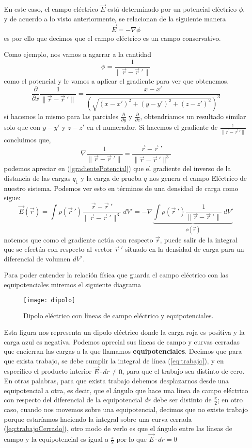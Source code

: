 \documentclass[11pt,a4paper]{article}
\begin{document}
En este caso, el campo eléctrico $\vec{E}$ está determinado por un potencial eléctrico $\phi$, y de acuerdo a lo visto anteriormente, se relacionan de la siguiente manera
$$\vec{E}=-\nabla \phi$$
es por ello que decimos que el campo eléctrico es un campo conservativo.

Como ejemplo, nos vamos a agarrar a  la cantidad 
$$\phi=\frac{1}{\|\vec{r}-\vec{r}\ '\|}$$
como el potencial y le vamos a aplicar el gradiente para ver que obtenemos.
$$\frac{\partial}{\partial x}\frac{1}{\|\vec{r}-\vec{r}\ '\|}=\frac{x-x'}{\left(\sqrt{(x-x')^2+(y-y')^2+(z-z')^2}\right)^3}$$
si hacemos lo mismo para las parciales $\frac{\partial}{\partial y}$ y $\frac{\partial}{\partial z}$, obtendríamos un resultado similar solo que con $y-y'$ y $z-z'$ en el numerador. Si hacemos el gradiente de $\frac{1}{\|\vec{r}-\vec{r}\ '\|}$ concluimos que,
\begin{equation}\label{gradientePotencial}
\nabla\frac{1}{\|\vec{r}-\vec{r}\ '\|}=\frac{\vec{r}-\vec{r}\ '}{\|\vec{r}-\vec{r}\ '\|^3}
\end{equation}
podemos apreciar en (\ref{gradientePotencial}) que el gradiente del inverso de la distancia de las cargas $q_1$ y la carga de prueba $q$ nos genera el campo Eléctrico de nuestro sistema. Podemos ver esto en términos de una densidad de carga como sigue:
$$\vec{E}(\vec{r})=\int\rho(\vec{r}\ ')\frac{\vec{r}-\vec{r}\ '}{\|\vec{r}-\vec{r}\ '\|^3}\ dV'=-\nabla\underbrace{\int\rho(\vec{r}\ ')\frac{1}{\|\vec{r}-\vec{r}\ '\|}\ dV'}_{\phi(\vec{r})}$$
notemos que como el gradiente actúa con respecto $\vec{r}$, puede salir de la integral que se efectúa con respecto al vector $\vec{r}\ '$ situado en la densidad de carga para un diferencial de volumen $dV'$.

Para poder entender la relación física que guarda el campo eléctrico con las equipotenciales miremos el siguiente diagrama
\begin{figure}[h!]
\centering
\texttt{[image: dipolo]}
\caption{Dipolo eléctrico con líneas de campo eléctrico y equipotenciales.}
\label{fig1:dipolo}
\end{figure}

Esta figura nos representa un dipolo eléctrico donde la carga roja es positiva y la carga azul es negativa. Podemos aprecial sus líneas de campo y curvas cerradas que encierran las cargas a la que llamamos \textbf{equipotenciales}. Decimos que para que exista trabajo, se debe cumplir la integral de línea (\ref{eq:trabajo}), y en específico el producto interior $\vec{E}\cdot dr\neq0$, para que el trabajo sea distinto de cero. En otras palabras, para que exista trabajo debemos desplazarnos desde una equipotencial a otra, es decir, que el ángulo que hace una línea de campo eléctrico con respecto del diferencial de la equipotencial $dr$ debe ser distinto de $\frac{\pi}{2}$; en otro caso, cuando nos movemos sobre una equipotencial, decimos que no existe trabajo porque estaríamos haciendo la integral sobre una curva cerrada (\ref{eq:trabajoCerrado}), otro modo de verlo es que el ángulo entre las líneas de campo y la equipotencial es igual a $\frac{\pi}{2}$ por lo que $\vec{E}\cdot dr=0$
\end{document}
